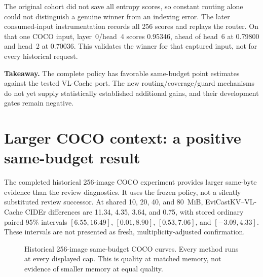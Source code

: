 \documentclass[10pt,letterpaper]{article}
\newcommand{\Evi}{EviCastKV}
\newcommand{\takeaway}[1]{\par\smallskip\noindent\textbf{Takeaway.} #1\par\smallskip}
\begin{document}
The original cohort did not save all entropy scores, so constant routing
alone could not distinguish a genuine winner from an indexing error.
The later consumed-input instrumentation records all 256 scores and
replays the router. On that one COCO input, layer~0/head~4 scores 0.95346,
ahead of head~6 at 0.79800 and head~2 at 0.70036. This validates the
winner for that captured input, not for every historical request.

\takeaway{The complete policy has favorable same-budget point estimates
against the tested VL-Cache port. The new routing/coverage/guard mechanisms
do not yet supply statistically established additional gains, and their
development gates remain negative.}

\section{Larger COCO context: a positive same-budget result}
\label{sec:coco}
The completed historical 256-image COCO experiment provides larger
same-byte evidence than the review diagnostics. It uses the frozen policy,
not a silently substituted review successor. At shared 10, 20, 40, and
80~MiB, \Evi--VL-Cache CIDEr differences are 11.34, 4.35, 3.64, and
0.75, with stored ordinary paired 95\% intervals $[6.55,16.49]$,
$[0.01,8.90]$, $[0.53,7.06]$, and $[-3.09,4.33]$. These intervals are
not presented as fresh, multiplicity-adjusted confirmation.

\begin{figure}[htbp]
\centering
{}
\caption{Historical 256-image same-budget COCO curves. Every method runs
at every displayed cap. This is quality at matched memory, not evidence of
smaller memory at equal quality.}
\label{fig:coco}
\end{figure}
\end{document}
